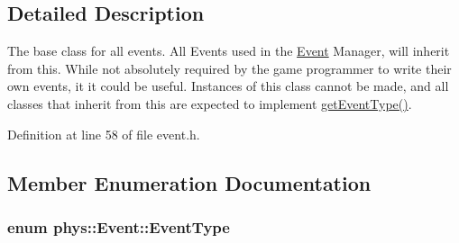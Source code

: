 \subsection{Detailed Description}
The base class for all events. All Events used in the \hyperlink{classphys_1_1Event}{Event} Manager, will inherit from this. While not absolutely required by the game programmer to write their own events, it it could be useful. Instances of this class cannot be made, and all classes that inherit from this are expected to implement \hyperlink{classphys_1_1Event_ac2c0623a6bc399e62f4b9fb2c022ea73}{getEventType()}. 

Definition at line 58 of file event.h.



\subsection{Member Enumeration Documentation}
\hypertarget{classphys_1_1Event_af5fdbb3e08d8e578d58770fbc606fda7}{
\subsubsection[{EventType}]{\setlength{\rightskip}{0pt plus 5cm}enum {\bf phys::Event::EventType}}}
\label{d5/dcb/classphys_1_1Event_af5fdbb3e08d8e578d58770fbc606fda7}
